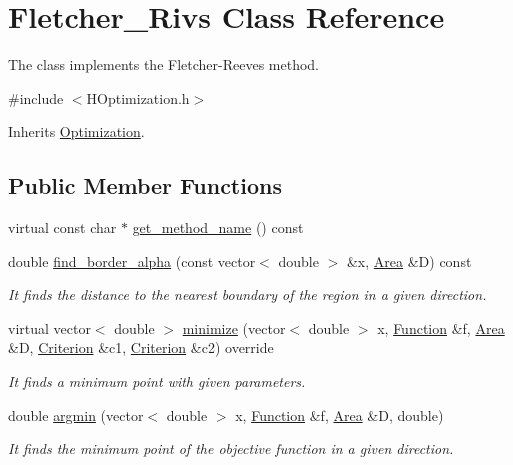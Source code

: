 \hypertarget{class_fletcher___rivs}{}\section{Fletcher\+\_\+\+Rivs Class Reference}
\label{class_fletcher___rivs}


The class implements the Fletcher-\/\+Reeves method.  




{\ttfamily \#include $<$H\+Optimization.\+h$>$}



Inherits \hyperlink{class_optimization}{Optimization}.

\subsection*{Public Member Functions}
\begin{DoxyCompactItemize}
\item 
virtual const char $\ast$ \hyperlink{class_fletcher___rivs_a2aa5d90c6c4ac0773533adb4ec7c9038}{get\+\_\+method\+\_\+name} () const
\item 
double \hyperlink{class_fletcher___rivs_a2d42dcde66a34d8199d4d2a8e7c6805e}{find\+\_\+border\+\_\+alpha} (const vector$<$ double $>$ \&x, \hyperlink{class_area}{Area} \&D) const
\begin{DoxyCompactList}\small\item\em It finds the distance to the nearest boundary of the region in a given direction. \end{DoxyCompactList}\item 
virtual vector$<$ double $>$ \hyperlink{class_fletcher___rivs_a65fe40d186bda0e0a4de8a75aaac01e8}{minimize} (vector$<$ double $>$ x, \hyperlink{class_function}{Function} \&f, \hyperlink{class_area}{Area} \&D, \hyperlink{class_criterion}{Criterion} \&c1, \hyperlink{class_criterion}{Criterion} \&c2) override
\begin{DoxyCompactList}\small\item\em It finds a minimum point with given parameters. \end{DoxyCompactList}\item 
double \hyperlink{class_fletcher___rivs_a797e04bd845d2a9d8ad6506b3fd33cec}{argmin} (vector$<$ double $>$ x, \hyperlink{class_function}{Function} \&f, \hyperlink{class_area}{Area} \&D, double)
\begin{DoxyCompactList}\small\item\em It finds the minimum point of the objective function in a given direction. \end{DoxyCompactList}\end{DoxyCompactItemize}



